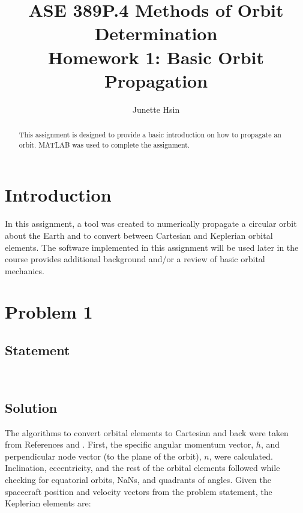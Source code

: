 \documentclass[conf]{new-aiaa}
\title{ASE 389P.4 Methods of Orbit Determination \\ Homework 1: Basic Orbit Propagation}
\author{Junette Hsin}
\affil{Masters Student, Aerospace Engineering and Engineering Mechanics, University of Texas, Austin, TX 78712}
\begin{document}
\maketitle

\begin{abstract}
This assignment is designed to provide a basic introduction on how to propagate an orbit. MATLAB was used to complete the assignment. 
\end{abstract}


\section{Introduction}

In this assignment, a tool was created to numerically propagate a circular orbit about the Earth and to convert between Cartesian and Keplerian orbital elements. The software implemented in this assignment will be used later in the course provides additional background and/or a review of basic orbital mechanics.



\section{Problem 1}

\subsection{Statement} 
\begin{center}
 \\
\end{center}

\subsection{Solution} 

The algorithms to convert orbital elements to Cartesian and back were taken from References \cite{bate_astrodynamics} and \cite{jah_mod3}. First, the specific angular momentum vector, $h$, and perpendicular node vector (to the plane of the orbit), $n$, were calculated. Inclination, eccentricity, and the rest of the orbital elements followed while checking for equatorial orbits, NaNs, and quadrants of angles. Given the spacecraft position and velocity vectors from the problem statement, the Keplerian elements are: 
\end{document}

